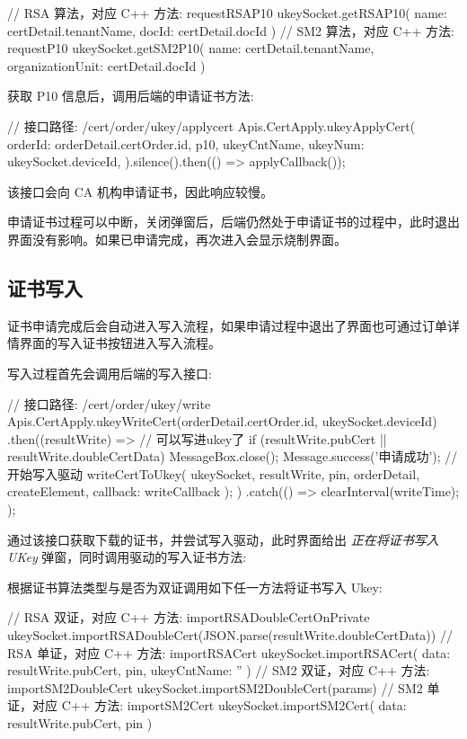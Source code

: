 \begin{JavaScript}
// RSA 算法，对应 C++ 方法: requestRSAP10 
ukeySocket.getRSAP10({ name: certDetail.tenantName, docId: certDetail.docId })
// SM2 算法，对应 C++ 方法: requestP10
ukeySocket.getSM2P10({ name: certDetail.tenantName, organizationUnit: certDetail.docId })
\end{JavaScript}

获取 P10 信息后，调用后端的申请证书方法:

\begin{JavaScript}
// 接口路径: /cert/order/ukey/applycert
Apis.CertApply.ukeyApplyCert({
    orderId: orderDetail.certOrder.id,
    p10,
    ukeyCntName,
    ukeyNum: ukeySocket.deviceId,
}).silence().then(() => applyCallback());
\end{JavaScript}

该接口会向 CA 机构申请证书，因此响应较慢。

申请证书过程可以中断，关闭弹窗后，后端仍然处于申请证书的过程中，此时退出界面没有影响。如果已申请完成，再次进入会显示烧制界面。

\subsection{证书写入}

证书申请完成后会自动进入写入流程，如果申请过程中退出了界面也可通过订单详情界面的写入证书按钮进入写入流程。

写入过程首先会调用后端的写入接口:

\begin{JavaScript}
// 接口路径: /cert/order/ukey/write
Apis.CertApply.ukeyWriteCert(orderDetail.certOrder.id, ukeySocket.deviceId)
    .then((resultWrite) => {
    // 可以写进ukey了
    if (resultWrite.pubCert || resultWrite.doubleCertData) {
        MessageBox.close();
        Message.success('申请成功');
        // 开始写入驱动
        writeCertToUkey({ ukeySocket, resultWrite, pin, orderDetail, createElement, callback: writeCallback });
    }
})
.catch(() => {
    clearInterval(writeTime);
});
\end{JavaScript}

通过该接口获取下载的证书，并尝试写入驱动，此时界面给出 \textit{正在将证书写入UKey} 弹窗，同时调用驱动的写入证书方法:

根据证书算法类型与是否为双证调用如下任一方法将证书写入 Ukey:

\begin{JavaScript}
// RSA 双证，对应 C++ 方法: importRSADoubleCertOnPrivate 
ukeySocket.importRSADoubleCert(JSON.parse(resultWrite.doubleCertData))
// RSA 单证，对应 C++ 方法: importRSACert 
ukeySocket.importRSACert({ data: resultWrite.pubCert, pin, ukeyCntName: '' })
// SM2 双证，对应 C++ 方法: importSM2DoubleCert 
ukeySocket.importSM2DoubleCert(params)
// SM2 单证，对应 C++ 方法: importSM2Cert 
ukeySocket.importSM2Cert({ data: resultWrite.pubCert, pin })
\end{JavaScript}


